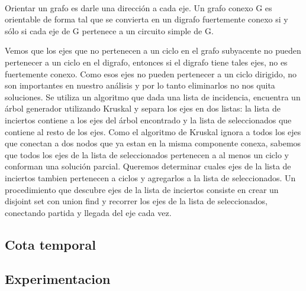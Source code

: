 \\
\par
Orientar un grafo es darle una dirección a cada eje. Un grafo conexo G es orientable de forma tal que se convierta en un digrafo fuertemente conexo si y sólo si cada eje de G pertenece a un circuito simple de G.
\\
\par
Vemos que los ejes que no pertenecen a un ciclo en el grafo subyacente no pueden pertenecer a un ciclo en el digrafo, entonces si el digrafo tiene tales ejes, no es fuertemente conexo. Como esos ejes no pueden pertenecer a un ciclo dirigido, no son importantes en nuestro análisis y por lo tanto eliminarlos no nos quita soluciones. Se utiliza un algoritmo que dada una lista de incidencia, encuentra un árbol generador utilizando Kruskal y separa los ejes en dos listas: la lista de inciertos contiene a los ejes del árbol encontrado y la lista de seleccionados que contiene al resto de los ejes. Como el algoritmo de Kruskal ignora a todos los ejes que conectan a dos nodos que ya estan en la misma componente conexa, sabemos que todos los ejes de la lista de seleccionados pertenecen a al menos un ciclo y conforman una solución parcial. Queremos determinar cuales ejes de la lista de inciertos tambien pertenecen a ciclos y agregarlos a la lista de seleccionados. Un procedimiento que descubre ejes de la lista de inciertos consiste en crear un disjoint set con union find y recorrer los ejes de la lista de seleccionados, conectando partida y llegada del eje cada vez.
\subsection{Cota temporal}

\subsection{Experimentacion}

\pagebreak



 



